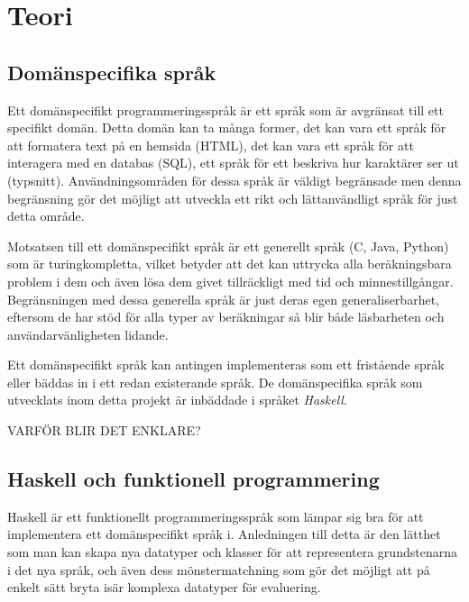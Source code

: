 
\chapter{Teori}

\section{Domänspecifika språk}
\begin{draft}
  Ett domänspecifikt programmeringsspråk är ett språk som är avgränsat till ett
  specifikt domän. Detta domän kan ta många former, det kan vara ett språk för
  att formatera text på en hemsida (HTML), det kan vara ett språk för att
  interagera med en databas (SQL), ett språk för ett beskriva hur karaktärer ser
  ut (typsnitt). Användningsområden för dessa språk är väldigt begränsade men
  denna begränsning gör det möjligt att utveckla ett rikt och lättanvändligt
  språk för just detta område. 

  Motsatsen till ett domänspecifikt språk är ett generellt språk (C, Java,
  Python) som är turingkompletta, vilket betyder att det kan uttrycka alla
  beräkningsbara problem i dem och även lösa dem givet tillräckligt med tid och
  minnestillgångar. Begränsningen med dessa generella språk är just deras egen
  generaliserbarhet, eftersom de har stöd för alla typer av beräkningar så blir
  både läsbarheten och användarvänligheten lidande.
  
  Ett domänspecifikt språk kan antingen implementeras som ett fristående språk
  eller bäddas in i ett redan existerande språk. De domänspecifika språk som
  utvecklats inom detta projekt är inbäddade i språket \textit{Haskell}.
\end{draft}

\begin{binge}
VARFÖR BLIR DET ENKLARE? 
\end{binge}

\section{Haskell och funktionell programmering}

\begin{draft}
  Haskell är ett funktionellt programmeringsspråk som lämpar sig bra för att
  implementera ett domänspecifikt språk i. Anledningen till detta är den lätthet
  som man kan skapa nya datatyper och klasser för att representera grundstenarna
  i det nya språk, och även dess mönstermatchning som gör det möjligt att på
  enkelt sätt bryta isär komplexa datatyper för evaluering.
\end{draft}

